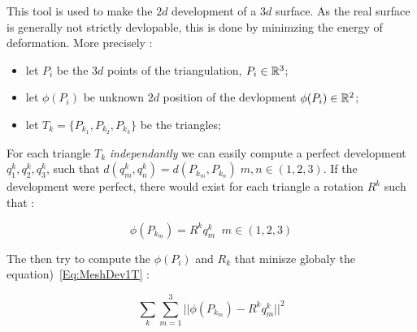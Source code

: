 This tool is used to make the $2d$ development of a $3d$ surface. As the real surface
is generally not strictly devlopable, this is done by minimzing the energy of deformation.
More precisely :

\begin{itemize}
      \item let  $P_i$ be the $3d$ points of the triangulation, $P_i \in \mathbb{R}^3$;
      \item let  $\phi(P_i)$ be unknown $2d$  position of the devlopment $\phi(P_i) \in \mathbb{R}^2$;
      \item let  $T_k = \{P_{k_1},P_{k_2},P_{k_3}\}$ be the triangles;
\end{itemize}

For each triangle  $T_k$ \emph{independantly} we can easily compute a perfect development
$q^k_1,q^k_2,q^k_3$, such that $d(q^k_m,q^k_n)=d(P_{k_m},P_{k_n}) \; m,n \in (1,2,3)$. If the development
were perfect, there would exist for each triangle a rotation $R^k$ such that :

\begin{equation}
	\phi(P_{k_m}) =  R^k q^k_m  \;\; m \in (1,2,3) \label{Eq:MeshDev1T}
\end{equation}


The then try to compute the $\phi(P_i)$ and $R_k$ that minisze globaly the equation)~\ref{Eq:MeshDev1T} :

\begin{equation}
    \sum_k \sum_{m=1}^3  ||\phi(P_{k_m}) - R^k q^k_m|| ^2
\end{equation}






